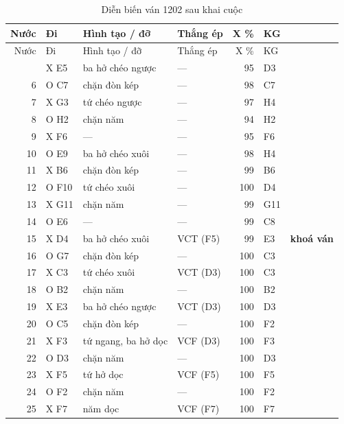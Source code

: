 \par{\scriptsize
\renewcommand{\arraystretch}{0.95}
\begin{longtable}{rlp{4.4cm}lrll}
  \caption{Diễn biến ván 1202 sau khai cuộc}\label{tab:cs-vs-1202}\\
    \toprule
    Nước & Đi & Hình tạo / đỡ & Thắng ép & X \% & KG &  \\
    \midrule
  \endfirsthead
    \toprule
    Nước & Đi & Hình tạo / đỡ & Thắng ép & X \% & KG &  \\
    \midrule
  \endhead
    \bottomrule
  \endfoot
    5 & X E5 & ba hở chéo ngược & --- & 95 & D3 &  \\
    6 & O C7 & chặn đòn kép & --- & 98 & C7 &  \\
    7 & X G3 & tứ chéo ngược & --- & 97 & H4 &  \\
    8 & O H2 & chặn năm & --- & 94 & H2 &  \\
    9 & X F6 & --- & --- & 95 & F6 &  \\
    10 & O E9 & ba hở chéo xuôi & --- & 98 & H4 &  \\
    11 & X B6 & chặn đòn kép & --- & 99 & B6 &  \\
    12 & O F10 & tứ chéo xuôi & --- & 100 & D4 &  \\
    13 & X G11 & chặn năm & --- & 99 & G11 &  \\
    14 & O E6 & --- & --- & 99 & C8 &  \\
    15 & X D4 & ba hở chéo xuôi & VCT (F5) & 99 & E3 & \textbf{khoá ván} \\
    16 & O G7 & chặn đòn kép & --- & 100 & C3 &  \\
    17 & X C3 & tứ chéo xuôi & VCT (D3) & 100 & C3 &  \\
    18 & O B2 & chặn năm & --- & 100 & B2 &  \\
    19 & X E3 & ba hở chéo ngược & VCT (D3) & 100 & D3 &  \\
    20 & O C5 & chặn đòn kép & --- & 100 & F2 &  \\
    21 & X F3 & tứ ngang, ba hở dọc & VCF (D3) & 100 & F3 &  \\
    22 & O D3 & chặn năm & --- & 100 & D3 &  \\
    23 & X F5 & tứ hở dọc & VCF (F5) & 100 & F5 &  \\
    24 & O F2 & chặn năm & --- & 100 & F2 &  \\
    25 & X F7 & năm dọc & VCF (F7) & 100 & F7 &  \\
\end{longtable}
}
